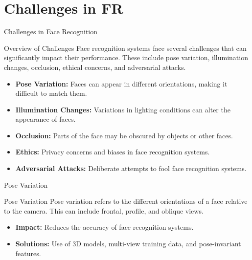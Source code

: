 \documentclass[pdfpagelabels=false, usepdftitle=false, aspectratio=169]{beamer}
\begin{document}
\section{Challenges in FR}
\begin{frame}{Challenges in Face Recognition}
\scriptsize
\begin{block}{Overview of Challenges}
    Face recognition systems face several challenges that can significantly impact their performance. These include pose variation, illumination changes, occlusion, ethical concerns, and adversarial attacks.
\end{block}
\begin{itemize}
    \item \textbf{Pose Variation:} Faces can appear in different orientations, making it difficult to match them.
    \item \textbf{Illumination Changes:} Variations in lighting conditions can alter the appearance of faces.
    \item \textbf{Occlusion:} Parts of the face may be obscured by objects or other faces.
    \item \textbf{Ethics:} Privacy concerns and biases in face recognition systems.
    \item \textbf{Adversarial Attacks:} Deliberate attempts to fool face recognition systems.
\end{itemize}
\end{frame}

\begin{frame}{Pose Variation}
\scriptsize
\begin{block}{Pose Variation}
    Pose variation refers to the different orientations of a face relative to the camera. This can include frontal, profile, and oblique views.
\end{block}
\begin{itemize}
    \item \textbf{Impact:} Reduces the accuracy of face recognition systems.
    \item \textbf{Solutions:} Use of 3D models, multi-view training data, and pose-invariant features.
\end{itemize}
\end{frame}
\end{document}

